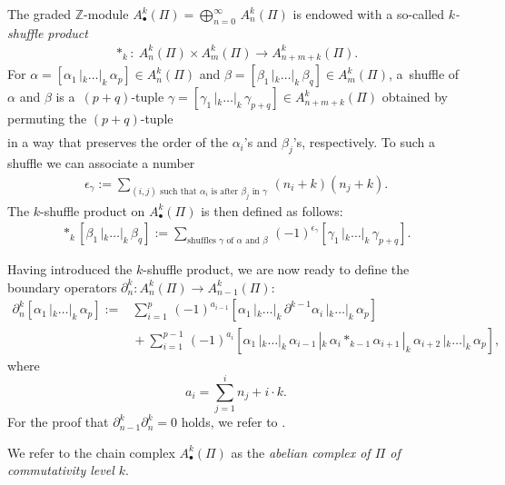 \documentclass[10pt,a4paper]{amsart}
\numberwithin{equation}{section}
\newcommand{\ZZ }{\mathbb{Z}}
\begin{document}
The graded $\ZZ$-module $A^k_\bullet(\Pi)=\bigoplus_{n=0}^\infty \, A^k_n(\Pi)$ is endowed with a so-called {\it $k$-shuffle product}
\begin{align*}
 \ast_k\colon \ A^k_n(\Pi) \times A^k_m(\Pi) \to A^k_{n+m+k}(\Pi).
\end{align*}
For $\alpha=[\alpha_1 \, |_k \dots |_k \, \alpha_p] \in A^k_n(\Pi)$ and $\beta =[\beta_1 \, |_k \dots |_k \, \beta_q] \in A^k_m(\Pi)$, a~shuffle of $\alpha$ and $\beta$ is a~$(p+q)$-tuple $\gamma=[\gamma_1 \, |_k \dots |_k \, \gamma_{p+q}] \in A^k_{n+m+k}(\Pi)$ obtained by permuting the $(p+q)$-tuple
\begin{align*}
 [\alpha_1 \, |_k \dots |_k \, \alpha_p \, |_k \,\beta_1 \, |_k \dots |_k \, \beta_q]
\end{align*}
in a way that preserves the order of the $\alpha_i$'s and $\beta_j$'s, respectively. To such a shuffle we can associate a number
\begin{align*}
 \epsilon_\gamma:= \sum_{\text{$(i,j)$ such that $\alpha_i$ is after $\beta_j$ in $\gamma$}} \, (n_i+k)(n_j+k).
\end{align*}
The $k$-shuffle product on $A^k_\bullet(\Pi)$ is then defined as follows:
\begin{align*}
 [\alpha_1 \, |_k \dots |_k \, \alpha_p] \ast_k [\beta_1 \, |_k \dots |_k \, \beta_q] := \sum_{\text{shuffles $\gamma$ of $\alpha$ and $\beta$}} \, (-1)^{\epsilon_\gamma}[\gamma_1 \, |_k \dots |_k \, \gamma_{p+q}].
\end{align*}

Having introduced the $k$-shuffle product, we are now ready to define the boundary operators $\partial^k_n\colon A^k_n(\Pi) \to A^k_{n-1}(\Pi)$:
\begin{align}
 \partial^k_n[\alpha_1 \, |_k \dots |_k \,\alpha_p]:=&{} \sum_{i=1}^p \, (-1)^{a_{i-1}}[\alpha_1 \, |_k \dots |_k \, \partial^{k-1}\alpha_i \, |_k \dots |_k \, \alpha_p]\nonumber\\
 &{}+\sum_{i=1}^{p-1}\,(-1)^{a_i}[\alpha_1 \, |_k \dots |_k \,\alpha_{i-1} \, |_k \, \alpha_i \ast_{k-1} \alpha_{i+1} \, |_k \, \alpha_{i+2} \, |_k \dots |_k \, \alpha_p],\label{def: boundary operator of abelian chains}
\end{align}
where
\[
a_i=\sum_{j=1}^i  n_j + i\cdot k.
\] For the proof that $\partial^k_{n-1}\partial^k_n = 0$ holds, we refer to \cite{Eilenberg1950a}.

We refer to the chain complex $A^k_\bullet(\Pi)$ as the {\it abelian complex of $\Pi$ of commutativity level $k$}.
\end{document}
